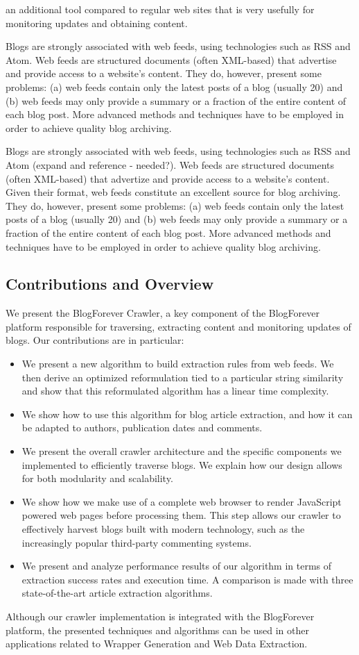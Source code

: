 an additional tool compared to regular web sites that is very usefully for monitoring updates and obtaining content.

Blogs are strongly associated with web feeds, using technologies such as RSS and Atom. Web feeds are structured documents (often XML-based) that advertise and provide access to a website's content. 
They do, however, present some problems:
(a) web feeds contain only the latest posts of a blog (usually 20) and
(b) web feeds may only provide a summary or a fraction of the entire content of each blog post. More advanced methods and techniques have to be employed in order to achieve quality blog archiving.


Blogs are strongly associated with web feeds, using technologies such as RSS and Atom (expand and reference - needed?). Web feeds are structured documents (often XML-based) that advertize and provide access to a website's content. Given their format, web feeds constitute an excellent source for blog archiving. They do, however, present some problems: (a) web feeds contain only the latest posts of a blog (usually 20) and (b) web feeds may only provide a summary or a fraction of the entire content of each blog post. More advanced methods and techniques have to be employed in order to achieve quality blog archiving.
  

\subsection{Contributions and Overview}
We present the BlogForever Crawler, a key component of the BlogForever platform responsible for traversing, extracting content and monitoring updates of blogs. Our contributions are in particular:

\begin{itemize}
  \item We present a new algorithm to build extraction rules from web feeds. We then derive an optimized reformulation tied to a particular string similarity and show that this reformulated algorithm has a linear time complexity.
  \item We show how to use this algorithm for blog article extraction, and how it can be adapted to authors, publication dates and comments.
  \item We present the overall crawler architecture and the specific components we implemented to efficiently traverse blogs. We explain how our design allows for both modularity and scalability.
  \item We show how we make use of a complete web browser to render JavaScript powered web pages before processing them. This step allows our crawler to effectively harvest blogs built with modern technology, such as the increasingly popular third-party commenting systems.
  \item We present and analyze performance results of our algorithm in terms of extraction success rates and execution time. A comparison is made with three state-of-the-art article extraction algorithms.
\end{itemize}

Although our crawler implementation is integrated with the BlogForever platform, the presented techniques and algorithms can be used in other applications related to Wrapper Generation and Web Data Extraction.
